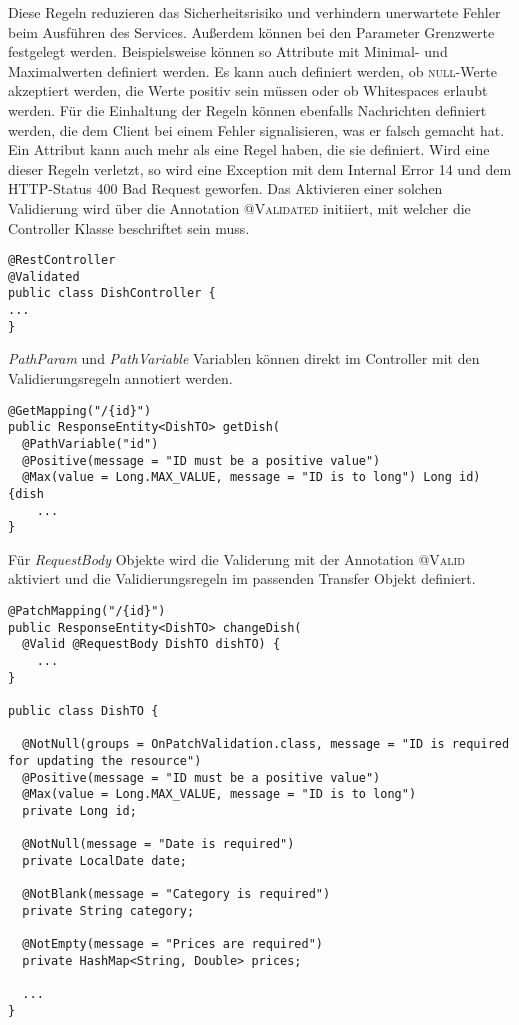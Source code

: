Diese Regeln reduzieren das Sicherheitsrisiko und verhindern unerwartete Fehler beim Ausführen des Services. Außerdem können bei den Parameter Grenzwerte festgelegt werden. Beispielsweise können so Attribute mit Minimal- und Maximalwerten definiert werden. Es kann auch definiert werden, ob \textsc{null}-Werte akzeptiert werden, die Werte positiv sein müssen oder ob Whitespaces erlaubt werden. Für die Einhaltung der Regeln können ebenfalls Nachrichten definiert werden, die dem Client bei einem Fehler signalisieren, was er falsch gemacht hat. Ein Attribut kann auch mehr als eine Regel haben, die sie definiert. Wird eine dieser Regeln verletzt, so wird eine Exception mit dem Internal Error 14 und dem \ac{HTTP}-Status 400 Bad Request geworfen. Das Aktivieren einer solchen Validierung wird über die Annotation \textsc{@Validated} initiiert, mit welcher die Controller Klasse beschriftet sein muss.

\begin{lstlisting}[caption={Validierung Aktivieren}, commentstyle=\color{green},]
@RestController
@Validated
public class DishController {
...
}
\end{lstlisting}

\textit{PathParam} und \textit{PathVariable} Variablen können direkt im Controller mit den Validierungsregeln annotiert werden.

\begin{lstlisting}[caption={Validierung einer PathVariable}, commentstyle=\color{green},]
@GetMapping("/{id}")
public ResponseEntity<DishTO> getDish(
  @PathVariable("id")
  @Positive(message = "ID must be a positive value")
  @Max(value = Long.MAX_VALUE, message = "ID is to long") Long id){dish
    ...
}
\end{lstlisting}

Für \textit{RequestBody} Objekte wird die Validerung mit der Annotation \textsc{@Valid} aktiviert und die Validierungsregeln im passenden Transfer Objekt definiert.

\newpage
\begin{lstlisting}[caption={Validierung von RequestBody}, commentstyle=\color{green},]
@PatchMapping("/{id}")
public ResponseEntity<DishTO> changeDish(
  @Valid @RequestBody DishTO dishTO) {
    ...
}

public class DishTO {

  @NotNull(groups = OnPatchValidation.class, message = "ID is required for updating the resource")
  @Positive(message = "ID must be a positive value")
  @Max(value = Long.MAX_VALUE, message = "ID is to long")
  private Long id;

  @NotNull(message = "Date is required")
  private LocalDate date;

  @NotBlank(message = "Category is required")
  private String category;

  @NotEmpty(message = "Prices are required")
  private HashMap<String, Double> prices;

  ...
}
\end{lstlisting}

